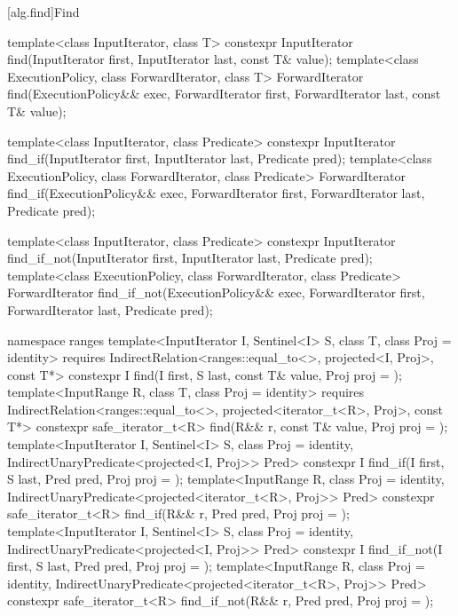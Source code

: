 [alg.find]{Find}

%
%
%
\begin{itemdecl}
template<class InputIterator, class T>
  constexpr InputIterator find(InputIterator first, InputIterator last,
                               const T& value);
template<class ExecutionPolicy, class ForwardIterator, class T>
  ForwardIterator find(ExecutionPolicy&& exec, ForwardIterator first, ForwardIterator last,
                       const T& value);

template<class InputIterator, class Predicate>
  constexpr InputIterator find_if(InputIterator first, InputIterator last,
                                  Predicate pred);
template<class ExecutionPolicy, class ForwardIterator, class Predicate>
  ForwardIterator find_if(ExecutionPolicy&& exec, ForwardIterator first, ForwardIterator last,
                          Predicate pred);

template<class InputIterator, class Predicate>
  constexpr InputIterator find_if_not(InputIterator first, InputIterator last,
                                      Predicate pred);
template<class ExecutionPolicy, class ForwardIterator, class Predicate>
  ForwardIterator find_if_not(ExecutionPolicy&& exec, ForwardIterator first, ForwardIterator last,
                              Predicate pred);

namespace ranges {
  template<InputIterator I, Sentinel<I> S, class T, class Proj = identity>
    requires IndirectRelation<ranges::equal_to<>, projected<I, Proj>, const T*>
      constexpr I find(I first, S last, const T& value, Proj proj = {});
  template<InputRange R, class T, class Proj = identity>
    requires IndirectRelation<ranges::equal_to<>, projected<iterator_t<R>, Proj>, const T*>
    constexpr safe_iterator_t<R>
      find(R&& r, const T& value, Proj proj = {});
  template<InputIterator I, Sentinel<I> S, class Proj = identity,
      IndirectUnaryPredicate<projected<I, Proj>> Pred>
    constexpr I find_if(I first, S last, Pred pred, Proj proj = {});
  template<InputRange R, class Proj = identity,
      IndirectUnaryPredicate<projected<iterator_t<R>, Proj>> Pred>
    constexpr safe_iterator_t<R>
      find_if(R&& r, Pred pred, Proj proj = {});
  template<InputIterator I, Sentinel<I> S, class Proj = identity,
      IndirectUnaryPredicate<projected<I, Proj>> Pred>
    constexpr I find_if_not(I first, S last, Pred pred, Proj proj = {});
  template<InputRange R, class Proj = identity,
      IndirectUnaryPredicate<projected<iterator_t<R>, Proj>> Pred>
    constexpr safe_iterator_t<R>
      find_if_not(R&& r, Pred pred, Proj proj = {});
}
\end{itemdecl}

